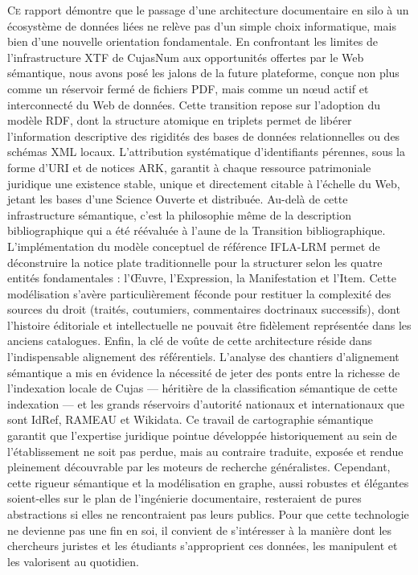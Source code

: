 \documentclass[12pt,twoside]{book}
\begin{document}
\lettrine{C}e rapport démontre que le passage d’une architecture documentaire en silo à un écosystème de données liées ne relève pas d’un simple choix informatique, mais bien d’une nouvelle orientation fondamentale. En confrontant les limites de l’infrastructure \ac{XTF} de CujasNum aux opportunités offertes par le Web sémantique, nous avons posé les jalons de la future plateforme, conçue non plus comme un réservoir fermé de fichiers \ac{PDF}, mais comme un nœud actif et interconnecté du Web de données.
Cette transition repose sur l'adoption du modèle \ac{RDF}, dont la structure atomique en triplets permet de libérer l'information descriptive des rigidités des bases de données relationnelles ou des schémas \ac{XML} locaux. L’attribution systématique d’identifiants pérennes, sous la forme d’\ac{URI} et de notices \ac{ARK}, garantit à chaque ressource patrimoniale juridique une existence stable, unique et directement citable à l’échelle du Web, jetant les bases d'une Science Ouverte et distribuée.
Au-delà de cette infrastructure sémantique, c'est la philosophie même de la description bibliographique qui a été réévaluée à l'aune de la Transition bibliographique. L'implémentation du modèle conceptuel de référence \ac{IFLA-LRM} permet de déconstruire la notice plate traditionnelle pour la structurer selon les quatre entités fondamentales : l’Œuvre, l’Expression, la Manifestation et l’Item. Cette modélisation s’avère particulièrement féconde pour restituer la complexité des sources du droit (traités, coutumiers, commentaires doctrinaux successifs), dont l’histoire éditoriale et intellectuelle ne pouvait être fidèlement représentée dans les anciens catalogues.
Enfin, la clé de voûte de cette architecture réside dans l'indispensable alignement des référentiels. L’analyse des chantiers d’alignement sémantique a mis en évidence la nécessité de jeter des ponts entre la richesse de l’indexation locale de Cujas — héritière de la classification sémantique de cette indexation — et les grands réservoirs d’autorité nationaux et internationaux que sont IdRef, \ac{RAMEAU} et Wikidata. Ce travail de cartographie sémantique garantit que l’expertise juridique pointue développée historiquement au sein de l'établissement ne soit pas perdue, mais au contraire traduite, exposée et rendue pleinement découvrable par les moteurs de recherche généralistes.
Cependant, cette rigueur sémantique et la modélisation en graphe, aussi robustes et élégantes soient-elles sur le plan de l'ingénierie documentaire, resteraient de pures abstractions si elles ne rencontraient pas leurs publics. Pour que cette technologie ne devienne pas une fin en soi, il convient de s’intéresser à la manière dont les chercheurs juristes et les étudiants s’approprient ces données, les manipulent et les valorisent au quotidien.
\end{document}
